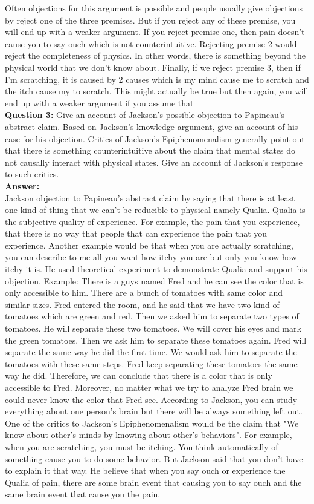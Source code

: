 \documentclass{article}
\begin{document}
\indent Often objections for this argument is possible and people usually give objections by reject one of the three premises. But if you reject any of these premise, you will end up with a weaker argument. If you reject premise one, then pain doesn't cause you to say ouch which is not counterintuitive. Rejecting premise 2 would reject the completeness of physics. In other words, there is something beyond the physical world that we don't know about. Finally, if we reject premise 3, then if I'm scratching, it is caused by 2 causes which is my mind cause me to scratch and the itch cause my to scratch. This might actually be true but then again, you will end up with a weaker argument if you assume that \\

\textbf{Question 3:} Give an account of Jackson's possible objection to Papineau's abstract claim. Based on Jackson's knowledge argument, give an account of his case for his objection. Critics of Jackson's Epiphenomenalism generally point out that there is something counterintuitive about the claim that mental states do not causally interact with physical states. Give an account of Jackson's response to such critics.\\
\indent \textbf{Answer: }\\
\indent Jackson objection to Papineau's abstract claim by saying that there is at least one kind of thing that we can't be reducible to physical namely Qualia. %
Qualia is the subjective quality of experience. For example, the pain that you experience, that there is no way that people that can experience the pain that you experience. Another example would be that when you are actually scratching, you can describe to me all you want how itchy you are but only you know how itchy it is. He used theoretical experiment to demonstrate Qualia and support his objection. Example: There is a guys named Fred and he can see the color that is only accessible to him. There are a bunch of tomatoes with same color and similar sizes. Fred entered the room, and he said that we have two kind of tomatoes which are green and red. Then we asked him to separate two types of tomatoes. He will separate these two tomatoes. We will cover his eyes and mark the green tomatoes. Then we ask him to separate these tomatoes again. Fred will separate the same way he did the first time. We would ask him to separate the tomatoes with these same steps. Fred keep separating these tomatoes the same way he did. Therefore, we can conclude that there is a color that is only accessible to Fred. Moreover, no matter what we try to analyze Fred brain we could never know the color that Fred see. According to Jackson, you can study everything about one person's brain but there will be always something left out. One of the critics to Jackson's Epiphenomenalism would be the claim that "We know about other's minds by knowing about other's behaviors". For example, when you are scratching, you must be itching. You think automatically of something cause you to do some behavior. But Jackson said that you don't have to explain it that way. He believe that when you say ouch or experience the Qualia of pain, there are some brain event that causing you to say ouch and the same brain event that cause you the pain.
\end{document}
